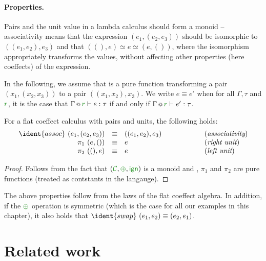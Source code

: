 \paragraph{Properties.}
Pairs and the unit value in a lambda calculus should form a monoid -- associativity means that 
the expression $(e_1, (e_2, e_3))$ should be isomorphic to $((e_1, e_2), e_3)$ and that
$((), e) \simeq e \simeq (e, ())$, where the isomorphism appropriately transforms the values,
without affecting other properties (here coeffects) of the expression. 

In the following, we assume that  is a pure function transforming a pair $(x_1, (x_2, x_3))$ 
to a pair $((x_1, x_2), x_3)$. We write $e \equiv e'$ when for all $\Gamma, \tau$ and $\cclrd{r}$,
it is the case that $\coctx{\Gamma}{\cclrd{r}} \vdash e : \tau$ if and only if
$\coctx{\Gamma}{\cclrd{r}} \vdash e' : \tau$.

\begin{theorem}
For a flat coeffect calculus with pairs and units, the following holds:
%
\begin{equation*}
\begin{array}{rclcl}
 \ident{assoc}~(e_1, (e_2, e_3)) &\equiv& ((e_1, e_2), e_3) &\qquad\qquad&(\emph{associativity}) \\
 \pi_1~(e, ()) &\equiv& e &&(\emph{right unit})\\
 \pi_2~((), e) &\equiv& e &&(\emph{left unit})\\
\end{array} 
\end{equation*}
\end{theorem}
\begin{proof}
Follows from the fact that $(\C, \cpar, \czero)$ is a monoid and , $\pi_1$ and
$\pi_2$ are pure functions (treated as contstants in the langauge).
\end{proof}

The above properties follow from the laws of the flat coeffect algebra. In addition, if the 
$\cpar$ operation is symmetric (which is the case for all our examples in this chapter), it 
also holds that $\ident{swap}~(e_1, e_2) \equiv (e_2, e_1)$.


\section{Related work}

